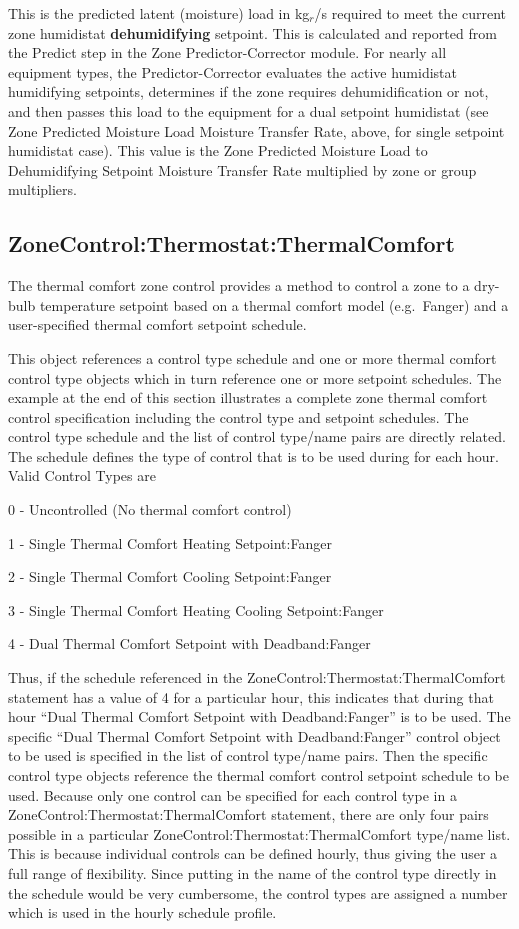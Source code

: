 This is the predicted latent (moisture) load in kg\(_{r}\)/s required to meet the current zone humidistat \textbf{dehumidifying} setpoint. This is calculated and reported from the Predict step in the Zone Predictor-Corrector module. For nearly all equipment types, the Predictor-Corrector evaluates the active humidistat humidifying setpoints, determines if the zone requires dehumidification or not, and then passes this load to the equipment for a dual setpoint humidistat (see Zone Predicted Moisture Load Moisture Transfer Rate, above, for single setpoint humidistat case). This value is the Zone Predicted Moisture Load to Dehumidifying Setpoint Moisture Transfer Rate multiplied by zone or group multipliers.

\subsection{ZoneControl:Thermostat:ThermalComfort}\label{zonecontrolthermostatthermalcomfort}

The thermal comfort zone control provides a method to control a zone to a dry-bulb temperature setpoint based on a thermal comfort model (e.g.~Fanger) and a user-specified thermal comfort setpoint schedule.

This object references a control type schedule and one or more thermal comfort control type objects which in turn reference one or more setpoint schedules. The example at the end of this section illustrates a complete zone thermal comfort control specification including the control type and setpoint schedules. The control type schedule and the list of control type/name pairs are directly related. The schedule defines the type of control that is to be used during for each hour. Valid Control Types are

0 - Uncontrolled (No thermal comfort control)

1 - Single Thermal Comfort Heating Setpoint:Fanger

2 - Single Thermal Comfort Cooling Setpoint:Fanger

3 - Single Thermal Comfort Heating Cooling Setpoint:Fanger

4 - Dual Thermal Comfort Setpoint with Deadband:Fanger

Thus, if the schedule referenced in the ZoneControl:Thermostat:ThermalComfort statement has a value of 4 for a particular hour, this indicates that during that hour ``Dual Thermal Comfort Setpoint with Deadband:Fanger'' is to be used. The specific ``Dual Thermal Comfort Setpoint with Deadband:Fanger'' control object to be used is specified in the list of control type/name pairs. Then the specific control type objects reference the thermal comfort control setpoint schedule to be used. Because only one control can be specified for each control type in a ZoneControl:Thermostat:ThermalComfort statement, there are only four pairs possible in a particular ZoneControl:Thermostat:ThermalComfort type/name list. This is because individual controls can be defined hourly, thus giving the user a full range of flexibility. Since putting in the name of the control type directly in the schedule would be very cumbersome, the control types are assigned a number which is used in the hourly schedule profile.

